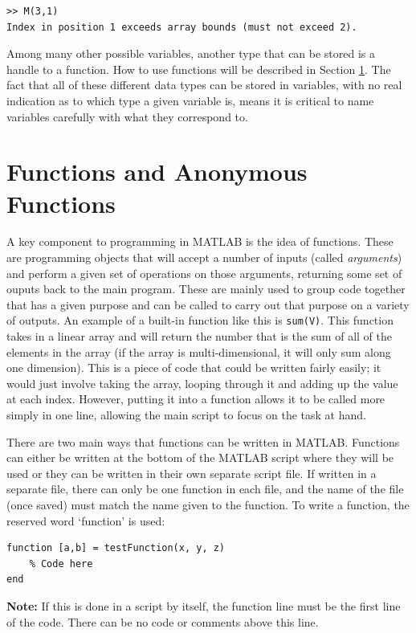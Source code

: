 \documentclass{ximera}
\begin{document}
\begin{verbatim}
>> M(3,1) 
Index in position 1 exceeds array bounds (must not exceed 2).
\end{verbatim}

Among many other possible variables, another type that can be stored is a handle to a function. How to use functions will be described in Section \ref{funMat:section}. The fact that all of these different data types can be stored in variables, with no real indication as to which type a given variable is, means it is critical to name variables carefully with what they correspond to. 

\section{Functions and Anonymous Functions} \label{funMat:section}

A key component to programming in MATLAB is the idea of functions. These are programming objects that will accept a number of inputs (called \emph{arguments}) and perform a given set of operations on those arguments, returning some set of ouputs back to the main program. These are mainly used to group code together that has a given purpose and can be called to carry out that purpose on a variety of outputs. An example of a built-in function like this is \texttt{sum(V)}. This function takes in a linear array and will return the number that is the sum of all of the elements in the array (if the array is multi-dimensional, it will only sum along one dimension). This is a piece of code that could be written fairly easily; it would just involve taking the array, looping through it and adding up the value at each index. However, putting it into a function allows it to be called more simply in one line, allowing the main script to focus on the task at hand. 

There are two main ways that functions can be written in MATLAB. Functions can either be written at the bottom of the MATLAB script where they will be used or they can be written in their own separate script file. If written in a separate file, there can only be one function in each file, and the name of the file (once saved) must match the name given to the function. To write a function, the reserved word `function' is used:
\begin{verbatim}
function [a,b] = testFunction(x, y, z)
    % Code here
end
\end{verbatim}

\textbf{Note:} If this is done in a script by itself, the function line must be the first line of the code. There can be no code or comments above this line.
\end{document}
